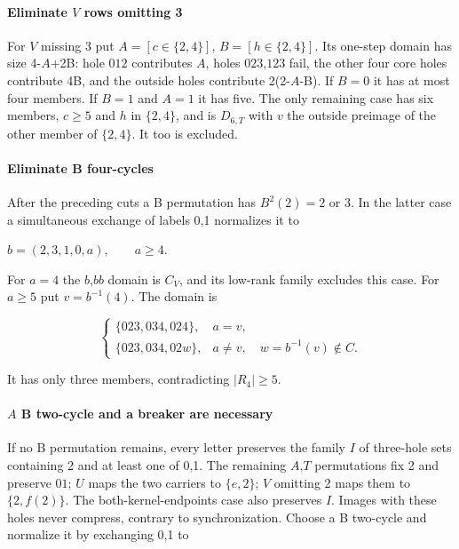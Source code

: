 \documentclass[11pt]{article}
\theoremstyle{definition}
\theoremstyle{plain}
\begin{document}
\paragraph{Eliminate \(V\) rows omitting
3}\label{eliminate-v-rows-omitting-3}

For \(V\) missing 3 put \(A=[c\in \{2,4\}]\), \(B=[h\in \{2,4\}]\). Its one-step domain has size 4-\(A\)+2B: hole \(012\)
contributes \(A\), holes \(023\),\(123\) fail, the other four core holes
contribute 4B, and the outside holes contribute 2(2-\(A\)-B). If \(B=0\)
it has at most four members. If \(B=1\) and \(A=1\) it has five. The
only remaining case has six members, \(c\ge 5\) and \(h\) in \(\{2,4\}\),
and is \(D_{6,T}\) with \(v\) the outside preimage of the other member
of \(\{2,4\}\). It too is excluded.

\paragraph{Eliminate B four-cycles}\label{eliminate-b-four-cycles}

After the preceding cuts a B permutation has \(B^{2}(2)=2\) or 3. In
the latter case a simultaneous exchange of labels 0,1 normalizes it
to

\(b=(2,3,1,0,a),\qquad a\ge4.\)

For \(a=4\) the \(b\),\(bb\) domain is \(C_V\), and its low-rank family
excludes this case. For \(a\ge 5\) put \(v=b^{-1}(4)\). The domain is

\[
\begin{cases}\{023,034,024\},&a=v,\\\{023,034,02w\},&a\ne v,\quad w=b^{-1}(v)\notin C.\end{cases}
\]

It has only three members, contradicting \(|R_{4}|\ge 5\).

\paragraph{\(A\) B two-cycle and a breaker are
necessary}\label{a-b-two-cycle-and-a-breaker-are-necessary}

If no B permutation remains, every letter preserves the family \(I\) of
three-hole sets containing 2 and at least one of 0,1. The remaining
\(A\),\(T\) permutations fix 2 and preserve \(01\); \(U\) maps the two
carriers to \(\{e,2\}\); \(V\) omitting 2 maps them to \(\{2,f(2)\}\). The
both-kernel-endpoints case also preserves \(I\). Images with these holes
never compress, contrary to synchronization. Choose a B two-cycle
and normalize it by exchanging 0,1 to
\end{document}
